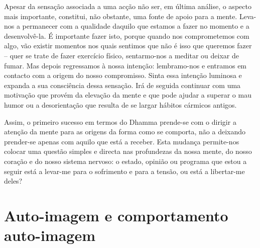 Apesar da sensação associada a uma acção não ser, em última análise, o aspecto mais importante, constitui, não obstante, uma fonte de apoio para a mente. Leva-nos a permanecer com a qualidade daquilo que estamos a fazer no momento e a desenvolvê-la. É importante fazer isto, porque quando nos comprometemos com algo, vão existir momentos nos quais sentimos que não é isso que queremos fazer -- quer se trate de fazer exercício físico, sentarmo-nos a meditar ou deixar de fumar. Mas depois regressamos à nossa intenção: lembramo-nos e entramos em contacto com a origem do nosso compromisso. Sinta essa intenção luminosa e expanda a sua consciência dessa sensação. Irá de seguida continuar com uma motivação que provém da elevação da mente e que pode ajudar a superar o mau humor ou a desorientação que resulta de se largar hábitos cármicos antigos.

Assim, o primeiro sucesso em termos do Dhamma prende-se com o dirigir a atenção da mente para as origens da forma como se comporta, não a deixando prender-se apenas com aquilo que está a receber. Esta mudança permite-nos colocar uma questão simples e directa nas profundezas da nossa mente, do nosso coração e do nosso sistema nervoso: o estado, opinião ou programa que estou a seguir está a levar-me para o sofrimento e para a tensão, ou está a libertar-me deles?

\section{Auto-imagem e comportamento auto-imagem}


